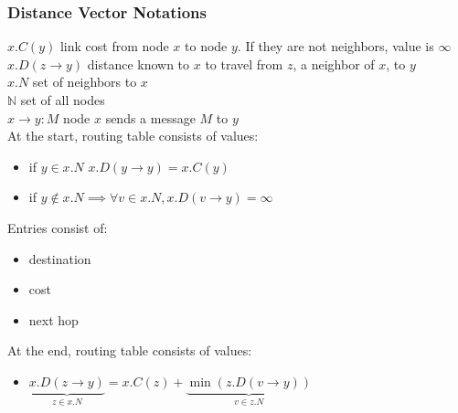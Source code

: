 \documentclass{article}
\begin{document}
  \subsubsection{Distance Vector Notations}
  $x.C(y)$ link cost from node $x$ to node $y$. If they are not neighbors, value is $\infty$ \\
  $x.D(z \rightarrow y)$ distance known to $x$ to travel from $z$, a neighbor of $x$, to $y$ \\
  $x.N$ set of neighbors to $x$ \\
  $\mathbb{N}$ set of all nodes \\
  $x \rightarrow y : M$ node $x$ sends a message $M$ to $y$ \\
  At the start, routing table consists of values:
  \begin{itemize}
    \item if $y \in x.N$ \implies $x.D(y \rightarrow y) = x.C(y)$
    \item if $y \notin x.N \implies \forall v \in x.N, x.D(v \rightarrow y) = \infty$
  \end{itemize}
  Entries consist of:
  \begin{itemize}
    \item destination
    \item cost
    \item next hop
  \end{itemize}
  At the end, routing table consists of values:
  \begin{itemize}
    \item $\underbrace{x.D(z \rightarrow y)}_{z \in x.N} = x.C(z) + \underbrace{\min(z.D(v \rightarrow y))}_{v \in z.N}$
  \end{itemize}
\end{document}
